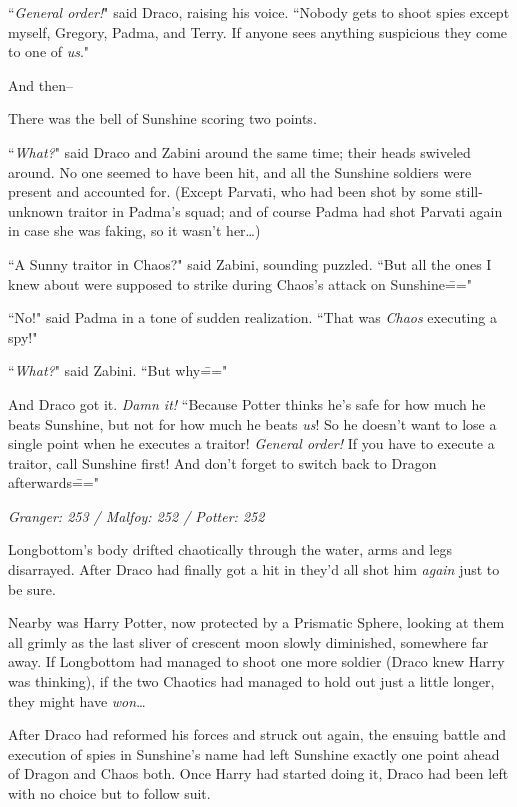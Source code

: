 ``\emph{General order!}" said Draco, raising his voice. ``Nobody gets to shoot spies except myself, Gregory, Padma, and Terry. If anyone sees anything suspicious they come to one of \emph{us}."

And then\---

There was the bell of Sunshine scoring two points.

``\emph{What?}" said Draco and Zabini around the same time; their heads swiveled around. No one seemed to have been hit, and all the Sunshine soldiers were present and accounted for. (Except Parvati, who had been shot by some still-unknown traitor in Padma's squad; and of course Padma had shot Parvati again in case she was faking, so it wasn't her{\ldots})

``A Sunny traitor in Chaos?" said Zabini, sounding puzzled. ``But all the ones I knew about were supposed to strike during Chaos's attack on Sunshine\==="

``No!" said Padma in a tone of sudden realization. ``That was \emph{Chaos} executing a spy!"

``\emph{What?}" said Zabini. ``But why\==="

And Draco got it. \emph{Damn it!} ``Because Potter thinks he's safe for how much he beats Sunshine, but not for how much he beats \emph{us}! So he doesn't want to lose a single point when he executes a traitor! \emph{General order!} If you have to execute a traitor, call Sunshine first! And don't forget to switch back to Dragon afterwards\==="

\later

\emph{Granger: 253 / Malfoy: 252 / Potter: 252}

Longbottom's body drifted chaotically through the water, arms and legs disarrayed. After Draco had finally got a hit in they'd all shot him \emph{again} just to be sure.

Nearby was Harry Potter, now protected by a Prismatic Sphere, looking at them all grimly as the last sliver of crescent moon slowly diminished, somewhere far away. If Longbottom had managed to shoot one more soldier (Draco knew Harry was thinking), if the two Chaotics had managed to hold out just a little longer, they might have \emph{won}{\ldots}

After Draco had reformed his forces and struck out again, the ensuing battle and execution of spies in Sunshine's name had left Sunshine exactly one point ahead of Dragon and Chaos both. Once Harry had started doing it, Draco had been left with no choice but to follow suit.

